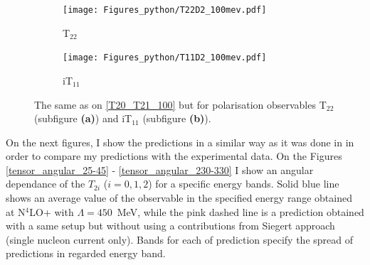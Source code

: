       
    \begin{figure}[htb]
        \centering
        \begin{subfigure}[b]{0.46\textwidth}
            \texttt{[image: Figures\_python/T22D2\_100mev.pdf]}
            \caption{T$_{22}$}
            \label{T22_100_vert}
        \end{subfigure}
        \begin{subfigure}[b]{0.46\textwidth}
            \texttt{[image: Figures\_python/T11D2\_100mev.pdf]}
            \caption{iT$_{11}$}
            \label{T11_100_vert}
        \end{subfigure}
        \caption{The same as on \ref{T20_T21_100} but for polarisation observables
        T$_{22}$ (subfigure {\bf (a)}) and iT$_{11}$ (subfigure {\bf (b)}).}
    \end{figure}


    
    On the next figures, I show the predictions in a similar way as it was done
    in \cite{rachek2007} in order to compare my predictions with the experimental
    data. On the Figures \ref{tensor_angular_25-45} - \ref{tensor_angular_230-330}
    I show an angular dependance of the $T_{2i}$ ($i=0,1,2$) for a specific energy bands.
    Solid blue line shows an average value of the observable in the specified energy range
    obtained at N$^4$LO+ with $\Lambda=450$~MeV, while the pink dashed line is a prediction
    obtained with a same setup but without using a contributions from Siegert approach
    (single nucleon current only). Bands for each of prediction specify the spread of
    predictions in regarded energy band.
    
